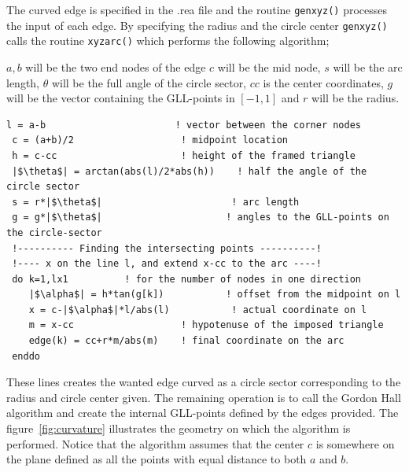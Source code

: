 The curved edge is specified in the .rea file and the routine \verb|genxyz()| processes the input of each edge. 
By specifying the radius and the circle center \verb|genxyz()| calls the routine \verb|xyzarc()| which performs the following algorithm;

$a,b$ will be the two end nodes of the edge 
$c$ will be the mid node, 
$s$ will be the arc length, 
$\theta$ will be the full angle of the circle sector,
$cc$ is the center coordinates, 
$g$ will be the vector containing the GLL-points in $[-1,1]$ 
and $r$ will be the radius.

\begingroup
\begin{lstlisting}[escapechar=|,frame=none]
 l = a-b                       ! vector between the corner nodes
 c = (a+b)/2                   ! midpoint location
 h = c-cc                      ! height of the framed triangle
 |$\theta$| = arctan(abs(l)/2*abs(h))    ! half the angle of the circle sector
 s = r*|$\theta$|                       ! arc length
 g = g*|$\theta$|                      ! angles to the GLL-points on the circle-sector
 !---------- Finding the intersecting points ----------!
 !---- x on the line l, and extend x-cc to the arc ----!
 do k=1,lx1          ! for the number of nodes in one direction
    |$\alpha$| = h*tan(g[k])           ! offset from the midpoint on l
    x = c-|$\alpha$|*l/abs(l)           ! actual coordinate on l
    m = x-cc                   ! hypotenuse of the imposed triangle
    edge(k) = cc+r*m/abs(m)    ! final coordinate on the arc
 enddo
\end{lstlisting}
\endgroup
These lines creates the wanted edge curved as a circle sector corresponding to the radius and circle center given.
The remaining operation is to call the Gordon Hall algorithm and create the internal GLL-points defined by the edges 
provided. The figure~\ref{fig:curvature} illustrates the geometry on which the algorithm is performed.
Notice that the algorithm assumes that the center $c$ is somewhere on the plane defined as all the 
points with equal distance to both $a$ and $b$.



